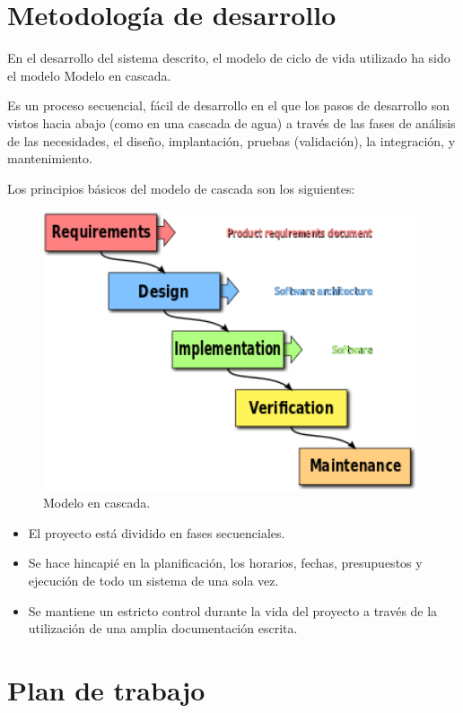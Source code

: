 \section{Metodología de desarrollo}
\label{sec:metodologiadedesarrollo}

En el desarrollo del sistema descrito, el modelo de ciclo de vida utilizado ha sido el modelo Modelo en cascada\cite{cascada}.

Es un proceso secuencial, fácil de desarrollo en el que los pasos de desarrollo son vistos hacia abajo (como en una cascada de agua) a través de las fases de análisis de las necesidades, el diseño, implantación, pruebas (validación), la integración, y mantenimiento. 

Los principios básicos del modelo de cascada son los siguientes:
\begin{figure} [hbtp]
  \begin{center}
    \includegraphics[width=11cm]{img/cap2/Waterfall_model}
  \end{center}
  \caption{Modelo en cascada.}
  \label{fig:Waterfall_model}
\end{figure}

\begin{itemize}
\item El proyecto está dividido en fases secuenciales.
\item Se hace hincapié en la planificación, los horarios, fechas, presupuestos y ejecución de todo un sistema de una sola vez.
\item Se mantiene un estricto control durante la vida del proyecto a través de la utilización de una amplia documentación escrita.
\end{itemize}

\section{Plan de trabajo}
\label{sec:plandetrabajo}

